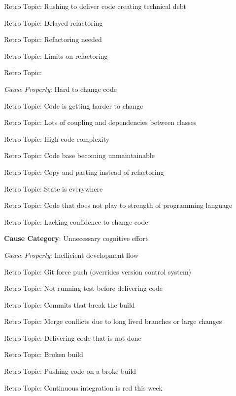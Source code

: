\quad \quad Retro Topic: Rushing to deliver code creating technical debt

\quad \quad Retro Topic: Delayed refactoring

\quad \quad Retro Topic: Refactoring needed 

\quad \quad Retro Topic: Limits on refactoring

\quad \quad Retro Topic: 

\quad \quad \textit{Cause Property}: Hard to change code

\quad \quad \quad Retro Topic: Code is getting harder to change

\quad \quad \quad Retro Topic: Lots of coupling and dependencies between classes

\quad \quad \quad Retro Topic: High code complexity

\quad \quad \quad Retro Topic: Code base becoming unmaintainable

\quad \quad \quad Retro Topic: Copy and pasting instead of refactoring

\quad \quad \quad Retro Topic: State is everywhere

\quad \quad \quad Retro Topic: Code that does not play to strength of programming language

\quad \quad \quad Retro Topic: Lacking confidence to change code

\quad \textbf{Cause Category}: Unnecessary cognitive effort

\quad \quad \textit{Cause Property}: Inefficient development flow

\quad \quad \quad Retro Topic: Git force push (overrides version control system)

\quad \quad \quad Retro Topic: Not running test before delivering code

\quad \quad \quad Retro Topic: Commits that break the build

\quad \quad \quad Retro Topic: Merge conflicts due to long lived branches or large changes

\quad \quad \quad Retro Topic: Delivering code that is not done

\quad \quad \quad Retro Topic: Broken build

\quad \quad \quad Retro Topic: Pushing code on a broke build

\quad \quad \quad Retro Topic: Continuous integration is red this week


